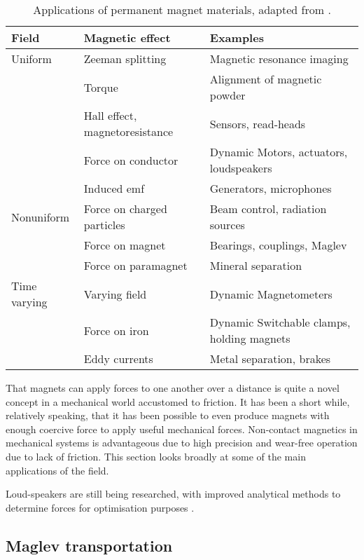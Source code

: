 \begin{table}
\begin{wide}
\begin{tabular}{@{}lll@{}}
\toprule
Field & Magnetic effect & Examples \\
\midrule
Uniform & Zeeman splitting & Magnetic resonance imaging \\
& Torque & Alignment of magnetic powder \\
& Hall effect, magnetoresistance & Sensors, read-heads \\
& Force on conductor & Dynamic Motors, actuators, loudspeakers \\
& Induced emf & Generators, microphones \\
Nonuniform & Force on charged particles & Beam control, 
radiation sources %
\\
& Force on magnet & Bearings, couplings, Maglev \\
& Force on paramagnet & Mineral separation \\
Time varying & Varying field & Dynamic Magnetometers \\
& Force on iron & Dynamic Switchable clamps, holding magnets \\
& Eddy currents & Metal separation, brakes \\
\bottomrule
\end{tabular}
\end{wide}
\caption{Applications of permanent magnet materials, 
adapted from \textcite{coey2002}.}
\end{table}

That magnets can apply forces to one another over a distance is quite a novel concept in a mechanical world accustomed to friction.
It has been a short while, relatively speaking, that it has been possible to even produce magnets with enough coercive force to apply useful mechanical forces.
Non-contact magnetics in mechanical systems is advantageous due to high precision and wear-free operation due to lack of friction.
This section looks broadly at some of the main applications of the field.

Loud-speakers are still being researched, with improved analytical methods to determine forces for optimisation purposes \cite{merit2009}.


\subsection{Maglev transportation}

